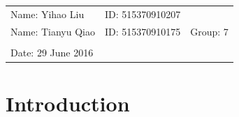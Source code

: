 \documentclass{article}
\begin{document}
\vspace*{0.25cm}

\hrulefill

\thispagestyle{empty}

\begin{center}
\begin{large}
\end{large}

\hrulefill

\vspace*{5cm}
\begin{Large}
\end{Large}

\vspace{2em}

\begin{large}
\end{large}
\end{center}


\vfill

\begin{table}[h!]
\flushleft
\begin{tabular}{lll}
Name: Yihao Liu \hspace*{2em}&
ID: 515370910207\hspace*{2em}\\
Name: Tianyu Qiao \hspace*{2em}&
ID: 515370910175\hspace*{2em}
& Group: 7\\


\\

Date: 29 June 2016 

\end{tabular}
\end{table}

\hfill
\begin{tiny}
[rev. 1.0]
\end{tiny}
\newpage

\section{Introduction}
\end{document}
